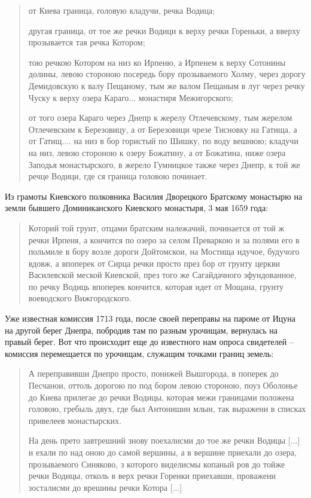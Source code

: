 \begin{quotation}
от Киева граница, головую кладучи, речка Водица;

другая граница, от тое же речки Водици к верху речки Гореньки, а вверху прозывается тая речка Котором;

тою речкою Котором на низ ко Ирпеню, а Ирпенем к верху Сотонины долины, левою стороною посередь бору прозываемого Холму, через дорогу Демидовскую к валу Пещаному, тым же валом Пещаным в луг через речку Чуску к верху озера Караго... монастиря Межигорского;

от того озера Караго через Днепр к жерелу Отлечевскому, тым жерелом Отлечевским к Березовицу, а от Березовици чрезе Тисновку на Гатища, а от Гатищ.... на низ в бор гористый по Шишку, по воду вешнюю; кладучи на низ, левою стороною к озеру Божатину, а от Божатина, ниже озера Заподья монастырского, в жерело Гумницкое также через Днепр, к той же речце Водици, где ся граница головою починает.
\end{quotation}

Из грамоты Киевского полковника Василия Дворецкого Братскому монастырю на земли бывшего Доминиканского Киевского монастыря, 3 мая 1659 года:

\begin{quotation}
Которий той грунт, отцами братским належачий, починается от той ж речки Ирпеня, а кончится по озеро за селом Преваркою и за полями его в польмиле в бору возле дороги Дойтомскои, на Мостища идучое, будучого вдовж, а впоперек от Сирца речки просто през бор от грунту церкви Василевской меской Киевской, през того же Сагайдачного зфундованное, по речку Водиць впоперек кончится, которая идет от Мощана, грунту воеводского Вижгородского.
\end{quotation}

Уже известная комиссия 1713 года, после своей переправы на пароме от Ицуна на другой берег Днепра, побродив там по разным урочищам, вернулась на правый берег. Вот что происходит еще до известного нам опроса свидетелей – комиссия перемещается по урочищам, служащим точками границ земель:

\begin{quotation}
А переправивши Днепро просто, понижей Вышгорода, в поперек до Песчанои, оттоль дорогою по под бором левою стороною, поуз Оболонье до Киева прилегае до речки Водицы, которая межи границами положена головою, гребыль двух, где был Антонишин млын, так выражени в списках привелеев монастырских.

На день прето завтрешний знову поехалисми до тое же речки Водицы [...] и ехали по над оною до самой вершины, а в вершине приехали до озера, прозываемого Синяково, з которого виделисмы копаный ров до тойже речки Водицы, отколь в верх речки Горенки приехавши, проважени зосталисми до врешины речки Котора [...] 
\end{quotation}

